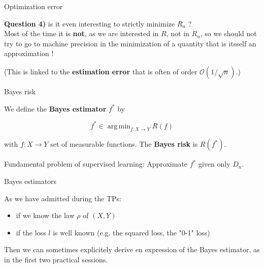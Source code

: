 \documentclass[usenames,dvipsnames]{beamer}
\DeclareMathOperator*{\argmin}{arg\,min}
\begin{document}
\begin{frame}{Optimization error}

    \textbf{Question 4)} {\color{Blue}is it even interesting to strictly minimize $R_n$ ?}
    \\

    Most of the time it is \textbf{not}, as we are interested in $R$, not in $R_n$, so we should not try to go to machine precision in the minimization of a quantity that is itsself an approximation !

    (This is linked to the \textbf{estimation error} that is often of order $ \mathcal{O}(1/ \sqrt{n})$.)
\end{frame}

% 
% 
% 


\begin{frame}{Bayes risk}

We define the \textbf{{Bayes estimator}} $f^*$ by

\begin{equation*}
    f^*\in \argmin_{f:X\rightarrow Y} R(f)
\end{equation*}

    with $f:X\rightarrow Y$ set of measurable functions. The \textbf{Bayes risk} is $R(f^*)$.


Fundamental problem of supervised learning: Approximate $f^*$ given only $D_n$.
\end{frame}

\begin{frame}{Bayes estimators}

    As we have admitted during the TPs:
    \begin{itemize}
    	\item if we know the law $\rho$ of $(X,Y)$
	\item if the loss $l$ is well known (e.g. the squared loss, the "0-1" loss)
    \end{itemize}
    Then we can sometimes explicitely derive en expression of the Bayes estimator, as in the first two practical sessions.
\end{frame}
\end{document}
